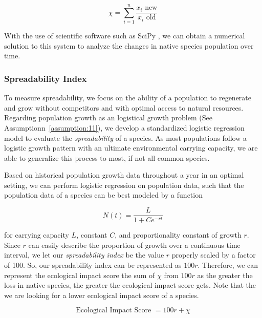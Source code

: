 \begin{equation}
    \chi = \sum_{i = 1}^n \frac{x_i {\text{ new}}}{x_i {\text{ old}}}
    \label{eq:nativepopratio}
\end{equation}

With the use of scientific software such as SciPy \cite{scipy}, we can obtain a numerical solution to this system to analyze the changes in native species population over time.

\subsubsection{Spreadability Index}

To measure spreadability, we focus on the ability of a population to regenerate and grow without competitors and with optimal access to natural resources. Regarding population growth as an logistical growth problem (See Assumptionn~\ref{assumption:11}), we develop a standardized logistic regression model to evaluate the \textit{spreadability} of a species. As most populations follow a logistic growth pattern with an ultimate environmental carrying capacity, we are able to generalize this process to most, if not all common species.

Based on historical population growth data throughout a year in an optimal setting, we can perform logistic regression on population data, such that the population data of a species can be best modeled by a function 

\begin{equation}
    N(t) = \frac{L}{1+Ce^{-rt}}
\end{equation}

for carrying capacity \(L\), constant \(C\), and proportionality constant of growth \(r\). Since \(r\) can easily describe the proportion of growth over a continuous time interval, we let our \textit{spreadability index} be the value \(r\) properly scaled by a factor of 100. So, our spreadability index can be represented as \(100r\). Therefore, we can represent the ecological impact score the sum of \(\chi\) from \(100r\) as the greater the loss in native species, the greater the ecological impact score gets.  Note that the we are looking for a lower ecological impact score of a species.

\begin{equation}
    \text{Ecological Impact Score } = 100r + \chi
    \label{eq:ecologicalimpact}
\end{equation}


